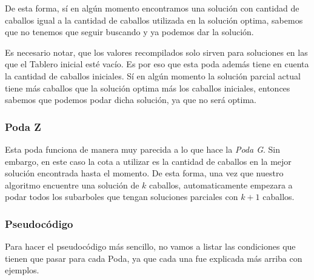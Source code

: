De esta forma, sí en algún momento encontramos una solución con cantidad de caballos igual a la cantidad de caballos utilizada en la solución optima, sabemos que no tenemos que seguir buscando y ya podemos dar la solución.

Es necesario notar, que los valores recompilados solo sirven para soluciones en las que el Tablero inicial esté vacío. Es por eso que esta poda además tiene en cuenta la cantidad de caballos iniciales. Sí en algún momento la solución parcial actual tiene más caballos que la solución optima más los caballos iniciales, entonces sabemos que podemos podar dicha solución, ya que no será optima.

\subsubsection{Poda Z}
Esta poda funciona de manera muy parecida a lo que hace la \textit{Poda G}. Sin embargo, en este caso la cota a utilizar es la cantidad de caballos en la mejor solución encontrada hasta el momento. De esta forma, una vez que nuestro algoritmo encuentre una solución de $k$ caballos, automaticamente empezara a podar todos los subarboles que tengan soluciones parciales con $k+1$ caballos.

\subsubsection{Pseudocódigo}
Para hacer el pseudocódigo más sencillo, no vamos a listar las condiciones que tienen que pasar para cada Poda, ya que cada una fue explicada más arriba con ejemplos.

